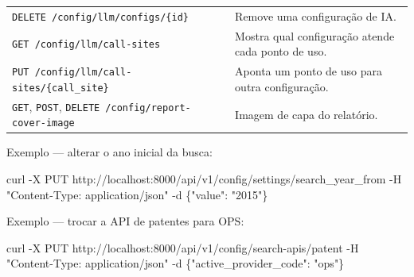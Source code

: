 \documentclass[
  brazilian,
  a4paper,12pt,oneside]{report}
\newenvironment{Shaded}{}{}
\newcommand{\DecValTok}[1]{\textcolor[rgb]{0.25,0.63,0.44}{#1}}
\newcommand{\FunctionTok}[1]{\textcolor[rgb]{0.02,0.16,0.49}{#1}}
\newcommand{\NormalTok}[1]{#1}
\newcommand{\OperatorTok}[1]{\textcolor[rgb]{0.40,0.40,0.40}{#1}}
\newcommand{\StringTok}[1]{\textcolor[rgb]{0.25,0.44,0.63}{#1}}
\begin{document}
{\begin{longtable}[]{@{}
  >{\raggedright\arraybackslash}p{}
  >{\raggedright\arraybackslash}p{}@{}}
\texttt{DELETE\ /}\allowbreak{}\texttt{config/}\allowbreak{}\texttt{llm/}\allowbreak{}\texttt{configs/}\allowbreak{}\texttt{\{id\}}
& Remove uma configuração de IA. \\
\texttt{GET\ /}\allowbreak{}\texttt{config/}\allowbreak{}\texttt{llm/}\allowbreak{}\texttt{call-}\allowbreak{}\texttt{sites}
& Mostra qual configuração atende cada ponto de uso. \\
\texttt{PUT\ /}\allowbreak{}\texttt{config/}\allowbreak{}\texttt{llm/}\allowbreak{}\texttt{call-}\allowbreak{}\texttt{sites/}\allowbreak{}\texttt{\{call\_}\allowbreak{}\texttt{site\}}
& Aponta um ponto de uso para outra configuração. \\
\texttt{GET}, \texttt{POST},
\texttt{DELETE\ /}\allowbreak{}\texttt{config/}\allowbreak{}\texttt{report-}\allowbreak{}\texttt{cover-}\allowbreak{}\texttt{image}
& Imagem de capa do relatório. \\
\end{longtable}
}

Exemplo --- alterar o ano inicial da busca:

\begin{Shaded}
\begin{Highlighting}[]
\FunctionTok{curl} \OperatorTok{{-}}\NormalTok{X PUT http}\OperatorTok{://}\NormalTok{localhost}\OperatorTok{:}\DecValTok{8000}\OperatorTok{/}\NormalTok{api}\OperatorTok{/}\NormalTok{v1}\OperatorTok{/}\NormalTok{config}\OperatorTok{/}\NormalTok{settings}\OperatorTok{/}\NormalTok{search\_year\_from \textasciigrave{}}
  \OperatorTok{{-}}\NormalTok{H }\StringTok{"Content{-}Type: application/json"}\NormalTok{ \textasciigrave{}}
  \OperatorTok{{-}}\NormalTok{d }\StringTok{\textquotesingle{}\{"value": "2015"\}\textquotesingle{}}
\end{Highlighting}
\end{Shaded}

Exemplo --- trocar a API de patentes para OPS:

\begin{Shaded}
\begin{Highlighting}[]
\FunctionTok{curl} \OperatorTok{{-}}\NormalTok{X PUT http}\OperatorTok{://}\NormalTok{localhost}\OperatorTok{:}\DecValTok{8000}\OperatorTok{/}\NormalTok{api}\OperatorTok{/}\NormalTok{v1}\OperatorTok{/}\NormalTok{config}\OperatorTok{/}\NormalTok{search{-}apis}\OperatorTok{/}\NormalTok{patent \textasciigrave{}}
  \OperatorTok{{-}}\NormalTok{H }\StringTok{"Content{-}Type: application/json"}\NormalTok{ \textasciigrave{}}
  \OperatorTok{{-}}\NormalTok{d }\StringTok{\textquotesingle{}\{"active\_provider\_code": "ops"\}\textquotesingle{}}
\end{Highlighting}
\end{Shaded}
\end{document}
